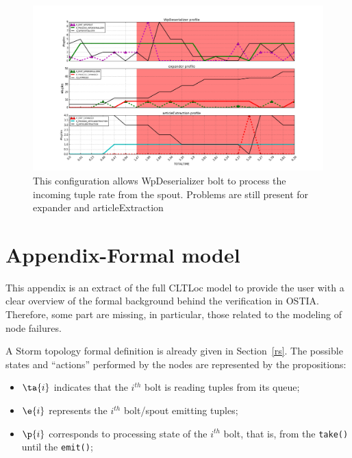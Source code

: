 \begin{figure}[h]
	\centering
	\includegraphics[width=0.7\linewidth]{images/appendix/3bolts-3}
	\caption{This configuration allows WpDeserializer bolt to process the incoming tuple rate from the spout. Problems are still present for expander and articleExtraction}
	\label{fig:3bolts-3}
\end{figure}

\clearpage
\section{Appendix-Formal model}\label{app:extended-formal-model}
\noindent
This appendix is an extract of the full CLTLoc model to provide the user with a clear overview of the formal background behind the verification in OSTIA.
Therefore, some part are missing, in particular, those related to the modeling of node failures.

A Storm topology formal definition is already given in Section~\ref{rs}.
The possible states and ``actions'' performed by the nodes are represented by the propositions:
\begin{itemize}
\item $\ta{i}$ indicates that the $i^{th}$ bolt is reading tuples from its queue;
\item $\e{i}$ represents the $ i^{th} $ bolt/spout  emitting tuples;
\item $\p{i}$ corresponds to processing state of the $i^{th}$ bolt, that is, from the \texttt{take()} until the \texttt{emit()}; 
\end{itemize}

